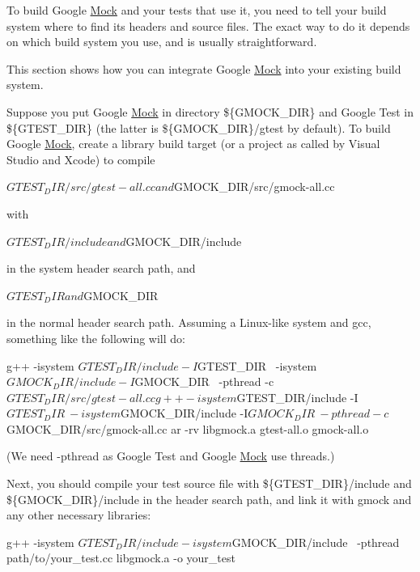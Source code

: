 To build Google \mbox{\hyperlink{class_mock}{Mock}} and your tests that use it, you need to tell your build system where to find its headers and source files. The exact way to do it depends on which build system you use, and is usually straightforward.

This section shows how you can integrate Google \mbox{\hyperlink{class_mock}{Mock}} into your existing build system.

Suppose you put Google \mbox{\hyperlink{class_mock}{Mock}} in directory {\ttfamily \$\{G\+M\+O\+C\+K\+\_\+\+D\+IR\}} and Google Test in {\ttfamily \$\{G\+T\+E\+S\+T\+\_\+\+D\+IR\}} (the latter is {\ttfamily \$\{G\+M\+O\+C\+K\+\_\+\+D\+IR\}/gtest} by default). To build Google \mbox{\hyperlink{class_mock}{Mock}}, create a library build target (or a project as called by Visual Studio and Xcode) to compile \begin{DoxyVerb}${GTEST_DIR}/src/gtest-all.cc and ${GMOCK_DIR}/src/gmock-all.cc
\end{DoxyVerb}


with \begin{DoxyVerb}${GTEST_DIR}/include and ${GMOCK_DIR}/include
\end{DoxyVerb}


in the system header search path, and \begin{DoxyVerb}${GTEST_DIR} and ${GMOCK_DIR}
\end{DoxyVerb}


in the normal header search path. Assuming a Linux-\/like system and gcc, something like the following will do\+: \begin{DoxyVerb}g++ -isystem ${GTEST_DIR}/include -I${GTEST_DIR} \
    -isystem ${GMOCK_DIR}/include -I${GMOCK_DIR} \
    -pthread -c ${GTEST_DIR}/src/gtest-all.cc
g++ -isystem ${GTEST_DIR}/include -I${GTEST_DIR} \
    -isystem ${GMOCK_DIR}/include -I${GMOCK_DIR} \
    -pthread -c ${GMOCK_DIR}/src/gmock-all.cc
ar -rv libgmock.a gtest-all.o gmock-all.o
\end{DoxyVerb}


(We need -\/pthread as Google Test and Google \mbox{\hyperlink{class_mock}{Mock}} use threads.)

Next, you should compile your test source file with \$\{G\+T\+E\+S\+T\+\_\+\+D\+IR\}/include and \$\{G\+M\+O\+C\+K\+\_\+\+D\+IR\}/include in the header search path, and link it with gmock and any other necessary libraries\+: \begin{DoxyVerb}g++ -isystem ${GTEST_DIR}/include -isystem ${GMOCK_DIR}/include \
    -pthread path/to/your_test.cc libgmock.a -o your_test
\end{DoxyVerb}


